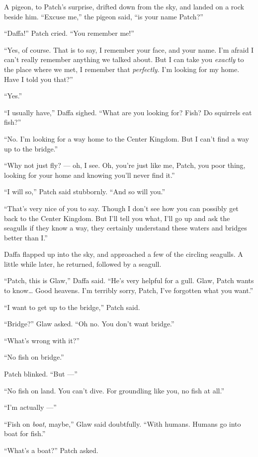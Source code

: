 \documentclass[ebook,oneside,openany,17pt]{memoir}
\begin{document}
A pigeon, to Patch’s surprise, drifted down from the sky, and landed
on a rock beside him. “Excuse me,” the pigeon said, “is your name
Patch?”

“Daffa!” Patch cried. “You remember me!”

“Yes, of course. That is to say, I remember your face, and your
name. I’m afraid I can’t really remember anything we talked about. But
I can take you \emph{exactly} to the place where we met, I remember
that \emph{perfectly.} I’m looking for my home. Have I told you
that?”

“Yes.”

“I usually have,” Daffa sighed. “What are you looking for? Fish? Do
squirrels eat fish?”

“No. I’m looking for a way home to the Center Kingdom. But I can’t
find a way up to the bridge.”

“Why not just fly? — oh, I see. Oh, you’re just like me, Patch, you
poor thing, looking for your home and knowing you’ll never find it.”

“I will so,” Patch said stubbornly. “And so will you.”

“That’s very nice of you to say. Though I don’t see how you can
possibly get back to the Center Kingdom. But I’ll tell you what, I’ll
go up and ask the seagulls if they know a way, they certainly
understand these waters and bridges better than I.”

Daffa flapped up into the sky, and approached a few of the circling
seagulls. A little while later, he returned, followed by a seagull.

“Patch, this is Glaw,” Daffa said. “He’s very helpful for a
gull. Glaw, Patch wants to know… Good heavens. I’m terribly sorry,
Patch, I’ve forgotten what you want.”

“I want to get up to the bridge,” Patch said.

“Bridge?” Glaw asked. “Oh no. You don’t want bridge.”

“What’s wrong with it?”

“No fish on bridge.”

Patch blinked. “But —”

“No fish on land. You can’t dive. For groundling like you, no fish at
all.”

“I’m actually —”

“Fish on \emph{boat,} maybe,” Glaw said doubtfully. “With
humans. Humans go into boat for fish.”

“What’s a boat?” Patch asked.
\end{document}
